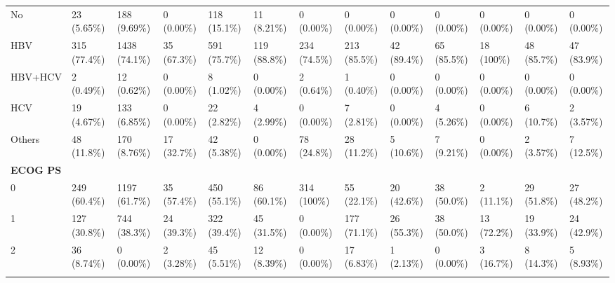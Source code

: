 \documentclass{article}
\begin{document}
\begin{landscape}
\begin{tiny}
\begin{tabularx}{\linewidth}{p{4.5cm}|X|X|X|X|X|X|X|X|X|X|X|X}
\rowcolor{gray!10}
    No &    23 (5.65\%)    &   188 (9.69\%)    &    0 (0.00\%)     &   118 (15.1\%)    &    11 (8.21\%)    &    0 (0.00\%)     &    0 (0.00\%)     &    0 (0.00\%)     &    0 (0.00\%)     &    0 (0.00\%)     &    0 (0.00\%)     &    0 (0.00\%)     \\
\rowcolor{gray!10}
    HBV &   315 (77.4\%)    &   1438 (74.1\%)   &    35 (67.3\%)    &   591 (75.7\%)    &   119 (88.8\%)    &   234 (74.5\%)    &   213 (85.5\%)    &    42 (89.4\%)    &    65 (85.5\%)    &    18 (100\%)     &    48 (85.7\%)    &    47 (83.9\%)    \\
\rowcolor{gray!10}
    HBV+HCV &    2 (0.49\%)     &    12 (0.62\%)    &    0 (0.00\%)     &    8 (1.02\%)     &    0 (0.00\%)     &    2 (0.64\%)     &    1 (0.40\%)     &    0 (0.00\%)     &    0 (0.00\%)     &    0 (0.00\%)     &    0 (0.00\%)     &    0 (0.00\%)     \\
\rowcolor{gray!10}
    HCV &    19 (4.67\%)    &   133 (6.85\%)    &    0 (0.00\%)     &    22 (2.82\%)    &    4 (2.99\%)     &    0 (0.00\%)     &    7 (2.81\%)     &    0 (0.00\%)     &    4 (5.26\%)     &    0 (0.00\%)     &    6 (10.7\%)     &    2 (3.57\%)     \\
\rowcolor{gray!10}
    Others &    48 (11.8\%)    &   170 (8.76\%)    &    17 (32.7\%)    &    42 (5.38\%)    &    0 (0.00\%)     &    78 (24.8\%)    &    28 (11.2\%)    &    5 (10.6\%)     &    7 (9.21\%)     &    0 (0.00\%)     &    2 (3.57\%)     &    7 (12.5\%)     \\
\rowcolor{gray!30}
\textbf{ECOG PS }  &  &  &  &  &  &  &  &  &  &  &  &  \\
\rowcolor{gray!10}
    0 &   249 (60.4\%)    &   1197 (61.7\%)   &    35 (57.4\%)    &   450 (55.1\%)    &    86 (60.1\%)    &    314 (100\%)    &    55 (22.1\%)    &    20 (42.6\%)    &    38 (50.0\%)    &    2 (11.1\%)     &    29 (51.8\%)    &    27 (48.2\%)    \\
\rowcolor{gray!10}
    1 &   127 (30.8\%)    &   744 (38.3\%)    &    24 (39.3\%)    &   322 (39.4\%)    &    45 (31.5\%)    &    0 (0.00\%)     &   177 (71.1\%)    &    26 (55.3\%)    &    38 (50.0\%)    &    13 (72.2\%)    &    19 (33.9\%)    &    24 (42.9\%)    \\
\rowcolor{gray!10}
    2 &    36 (8.74\%)    &    0 (0.00\%)     &    2 (3.28\%)     &    45 (5.51\%)    &    12 (8.39\%)    &    0 (0.00\%)     &    17 (6.83\%)    &    1 (2.13\%)     &    0 (0.00\%)     &    3 (16.7\%)     &    8 (14.3\%)     &    5 (8.93\%)     \\
\rowcolor{gray!30}

\end{tabularx}
\end{tiny}
\end{landscape}
\end{document}
